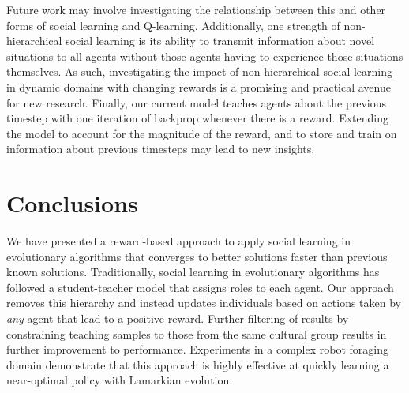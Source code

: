 \documentclass{acm_proc_article-sp}
\begin{document}
Future work may involve investigating the relationship between this and other forms of social learning and Q-learning.  Additionally, one strength of non-hierarchical social learning is its ability to transmit information about novel situations to all agents without those agents having to experience those situations themselves.  As such, investigating the impact of non-hierarchical social learning in dynamic domains with changing rewards is a promising and practical avenue for new research.  Finally, our current model teaches agents about the previous timestep with one iteration of backprop whenever there is a reward.  Extending the model to account for the magnitude of the reward, and to store and train on information about previous timesteps may lead to new insights.   

\section{Conclusions}
\label{sec:conclusions}

We have presented a reward-based approach to apply social learning in evolutionary algorithms that converges to better solutions faster than previous known solutions. Traditionally, social learning in evolutionary algorithms has followed a student-teacher model that assigns roles to each agent. Our approach removes this hierarchy and instead updates individuals based on actions taken by \textit{any} agent that lead to a positive reward.  Further filtering of results by constraining teaching samples to those from the same cultural group results in further improvement to performance.  Experiments in a complex robot foraging domain demonstrate that this approach is highly effective at quickly learning a near-optimal policy with Lamarkian evolution. 



\end{document}
